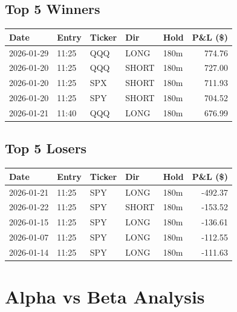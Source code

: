 \documentclass[11pt,a4paper,twoside]{article}
\begin{document}
\subsection{Top 5 Winners}
\noindent\begin{center}
\begin{tabular}{>{\color{txtmain}}l llll r}
\toprule
\rowcolor{cardbg}
\textbf{Date} & \textbf{Entry} & \textbf{Ticker} & \textbf{Dir} & \textbf{Hold} & \textbf{P\&L (\$)} \\
\midrule
2026-01-29 & 11:25 & QQQ & LONG & 180m & \textcolor{wingreen}{774.76} \\
2026-01-20 & 11:25 & QQQ & SHORT & 180m & \textcolor{wingreen}{727.00} \\
2026-01-20 & 11:25 & SPX & SHORT & 180m & \textcolor{wingreen}{711.93} \\
2026-01-20 & 11:25 & SPY & SHORT & 180m & \textcolor{wingreen}{704.52} \\
2026-01-21 & 11:40 & QQQ & LONG & 180m & \textcolor{wingreen}{676.99} \\
\bottomrule
\end{tabular}
\end{center}
\subsection{Top 5 Losers}
\noindent\begin{center}
\begin{tabular}{>{\color{txtmain}}l llll r}
\toprule
\rowcolor{cardbg}
\textbf{Date} & \textbf{Entry} & \textbf{Ticker} & \textbf{Dir} & \textbf{Hold} & \textbf{P\&L (\$)} \\
\midrule
2026-01-21 & 11:25 & SPY & LONG & 180m & \textcolor{lossred}{-492.37} \\
2026-01-22 & 11:25 & SPY & SHORT & 180m & \textcolor{lossred}{-153.52} \\
2026-01-15 & 11:25 & SPY & LONG & 180m & \textcolor{lossred}{-136.61} \\
2026-01-07 & 11:25 & SPY & LONG & 180m & \textcolor{lossred}{-112.55} \\
2026-01-14 & 11:25 & SPY & LONG & 180m & \textcolor{lossred}{-111.63} \\
\bottomrule
\end{tabular}
\end{center}
\clearpage
\clearpage
\section{Alpha vs Beta Analysis}
\end{document}
